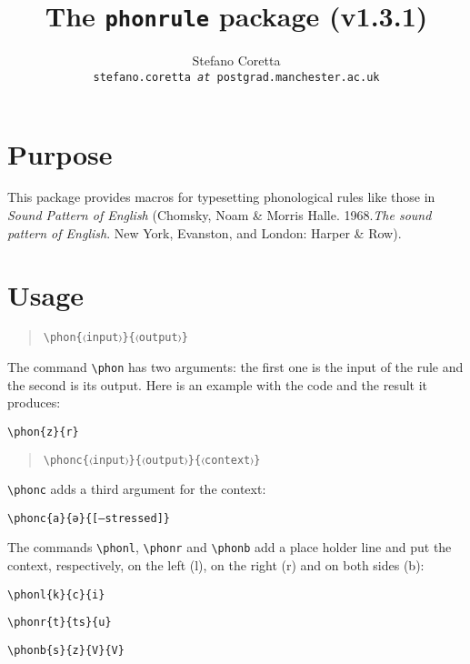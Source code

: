 \documentclass[a4paper]{article}
\title{The \texttt{phonrule} package (v1.3.1)}
\author{Stefano Coretta \\ \texttt{stefano.coretta \textit{at} postgrad.manchester.ac.uk}}
\begin{document}
\maketitle

\section{Purpose}
This package provides macros for typesetting phonological rules like those in \textit{Sound Pattern of English} (Chomsky, Noam \& Morris Halle. 1968.\textit{The sound pattern of English}. New York, Evanston, and London: Harper \& Row).

\section{Usage}

\begin{quote}
\begin{lstlisting}
\phon{〈input〉}{〈output〉}
\end{lstlisting}
\end{quote}

The command \verb+\phon+ has two arguments: the first one is the input of the rule and the second is its output.
Here is an example with the code and the result it produces:

\begin{exe}
\ex \verb+\phon{z}{r}+
\ex {}
\end{exe}

\begin{quote}
\begin{lstlisting}
\phonc{〈input〉}{〈output〉}{〈context〉}
\end{lstlisting}
\end{quote}

\verb+\phonc+ adds a third argument for the context:

\begin{exe}
\ex \verb+\phonc{a}{ə}{[–stressed]}+
\ex {}
\end{exe}

The commands \verb+\phonl+, \verb+\phonr+ and \verb+\phonb+ add a place holder line and put the context, respectively, on the left (l), on the right (r) and on both sides (b):

\begin{exe}
\ex
    \begin{xlist}
    \ex \verb+\phonl{k}{c}{i}+
    \ex {}
    \end{xlist}
\ex
    \begin{xlist}
    \ex \verb+\phonr{t}{ts}{u}+
    \ex {}
    \end{xlist}
\ex
    \begin{xlist}
    \ex \verb+\phonb{s}{z}{V}{V}+
    \ex {}
    \end{xlist}
\end{exe}
\end{document}
